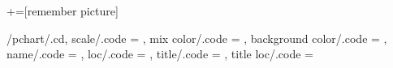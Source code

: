 \newcommand{\semitransp}[2][35]{\color{fg!#1}#2}

\newcommand{\specialcell}[2][c]{\begin{tabular}[#1]{@{}l@{}}#2\end{tabular}}

+=[remember picture]

\pgfkeys
{%
	/pchart/.cd,
	scale/.code                =  {\def\pchartscale{#1}},
	mix color/.code            =  {\def\pchartmixcolor{#1}},
	background color/.code     =  {\def\pchartbackcolor{#1}},
	name/.code                 =  {\def\pchartname{#1}},
	loc/.code                  =  {\def\pchartloc{#1}},
	title/.code                =  {\def\pcharttitle{#1}},
	title loc/.code            =  {\def\pcharttitleloc{#1}}
}
